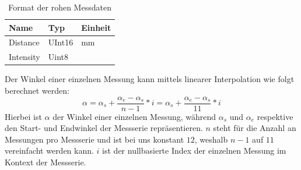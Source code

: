 \begin{table}[H]
    \centering
    \begin{tabular}{l|l|l}
    Name        & Typ       & Einheit   \\ \hline
    Distance    & UInt16    & mm        \\
    Intensity   & Uint8     &           \\ %
    \end{tabular}
    \caption{Format der rohen Messdaten}
    \label{tab:ld20-measurement-data}
\end{table}
Der Winkel einer einzelnen Messung kann mittels linearer Interpolation wie folgt berechnet werden:
\begin{equation}
    \alpha = \alpha_{s} + \frac{\alpha_{e}-\alpha_{s}}{n-1}*i = \alpha_{s} + \frac{\alpha_{e}-\alpha_{s}}{11}*i
\end{equation}
Hierbei ist $\alpha$ der Winkel einer einzelnen Messung,
während $\alpha_{s}$ und $\alpha_{e}$ respektive den Start- und Endwinkel der Messserie repräsentieren.
$n$ steht für die Anzahl an Messungen pro Messserie und ist bei uns konstant $12$,
weshalb $n-1$ auf $11$ vereinfacht werden kann. $i$ ist der nullbasierte Index der einzelnen Messung im Kontext der Messserie.



